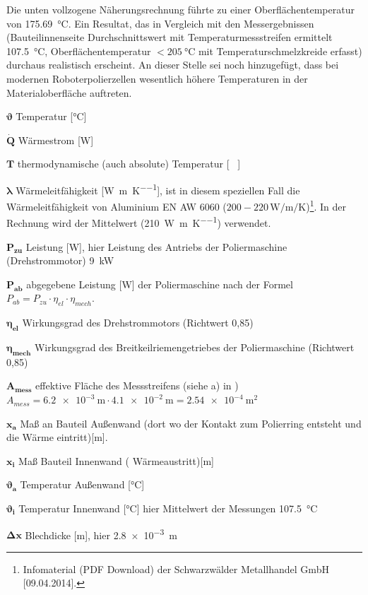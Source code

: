 \documentclass[12pt,a4paper,parskip,twoside,BCOR5mm,headsepline]{scrartcl}
\begin{document}
Die unten vollzogene Näherungsrechnung führte zu einer Oberflächentemperatur von \SI{175.69}{\degreeCelsius}. Ein Resultat, das in Vergleich mit den Messergebnissen (Bauteilinnenseite Durchschnittswert mit Temperaturmessstreifen ermittelt \SI{107.5}{\degreeCelsius}, Oberflächentemperatur $< \SI{205}{\degreeCelsius}$ mit Temperaturschmelzkreide erfasst) durchaus realistisch erscheint.
An dieser Stelle sei noch hinzugefügt, dass  bei modernen Roboterpolierzellen wesentlich höhere Temperaturen in der Materialoberfläche auftreten.



\newpage
\begin{description*}
\item[ $\boldsymbol{\vartheta }$] Temperatur  [\si{\degreeCelsius}]
\item[$ \boldsymbol{\dot{Q}} $ ] Wärmestrom [\si{\watt}]
\item[$\boldsymbol{ \si{T}}$] thermodynamische (auch absolute) Temperatur [\si{\kelvin
}]
\item[$\boldsymbol{\lambda} $] Wärmeleitfähigkeit [\si{\watt\per\metre\per\kelvin}], ist in diesem speziellen Fall die Wärmeleitfähigkeit von Aluminium EN AW 6060 ($200-220 \, \si{\watt\per\meter\per\kelvin}$)\footnote{Infomaterial (PDF Download)  der  Schwarzwälder Metallhandel GmbH [09.04.2014].}. In der Rechnung wird der Mittelwert (\SI{210}{\watt\per\meter\per\kelvin}) verwendet.
\item[$\boldsymbol{ P_{zu}} $] Leistung [\si{\watt}], hier Leistung des Antriebs der Poliermaschine (Drehstrommotor)  \SI{9}{\kilo\watt}
\item[$\boldsymbol{P_{ab}} $]  abgegebene Leistung [\si{\watt}] der Poliermaschine nach der Formel $ P_{ab} = P_{zu} \cdot \eta_{el} \cdot \eta_{mech}$. \autocite[R2]{g}
\item[$\boldsymbol{\eta_{el} }$] Wirkungsgrad des Drehstrommotors (Richtwert 0,85) \autocite[40]{tm}
\item[$\boldsymbol{\eta_{mech}} $]Wirkungsgrad des Breitkeilriemengetriebes der Poliermaschine (Richtwert 0,85) \autocite[40]{tm}
\item[$\boldsymbol{A_{mess}} $] effektive Fläche des Messstreifens (siehe  a) in ) $ A_{mess} = \SI{6.2e-3}{\meter} \cdot \SI{4.1e-2}{\meter} = \SI{2.54e-4}{\meter\squared}$
\item[$\boldsymbol{x_a }$]  Maß an Bauteil Außenwand (dort wo der Kontakt zum Polierring entsteht und die Wärme eintritt)[\si{\meter}]. 
\item[$\boldsymbol{x_i}$] Maß Bauteil Innenwand ( Wärmeaustritt)[\si{\meter}]
\item[$\boldsymbol{\vartheta_a}$] Temperatur Außenwand [\si{\degreeCelsius}] 
\item[$\boldsymbol{\vartheta_i}$] Temperatur Innenwand [\si{\degreeCelsius}] hier Mittelwert der Messungen \SI{107.5}{\degreeCelsius} 
\item[$\boldsymbol{ \Delta x }$] Blechdicke [\si{\meter}], hier \SI{2.8e-3}{\meter}


\end{description*}
\end{document}
